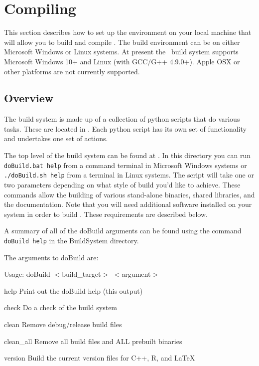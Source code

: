 \section{Compiling \CNAME}\label{sec:build_environment}

This section describes how to set up the environment on your local machine that will allow you to build and compile \CNAME. The build environment can be on either Microsoft Windows or Linux systems. At present the \CNAME\ build system supports Microsoft Windows 10+ and Linux (with GCC/G++ 4.9.0+). Apple OSX or other platforms are not currently supported.

\subsection{Overview}

The build system is made up of a collection of python scripts that do various tasks. These are located in . Each python script has its own set of functionality and undertakes one set of actions.

The top level of the build system can be found at . In this directory you can run \texttt{doBuild.bat help} from a command terminal in Microsoft Windows systems or \texttt{./doBuild.sh help} from a terminal in Linux systems.
The script will take one or two parameters depending on what style of build you'd like to achieve. These commands allow the building of various stand-alone binaries, shared libraries, and the documentation. Note that you will need additional software installed on your system in order to build \CNAME .  These requirements are described below.

A summary of all of the doBuild arguments can be found using the command \texttt{doBuild help} in the BuildSystem directory.

The arguments to doBuild are:

Usage: doBuild $<$build\_target$>$ $<$argument$>$
\begin{description}
  \item{help} Print out the doBuild help (this output)
  \item{check} Do a check of the build system
  \item{clean} Remove debug/release build files
  \item{clean\_all} Remove all build files and ALL prebuilt binaries
  \item{version} Build the current version files for C++, R, and LaTeX
\end{description}

